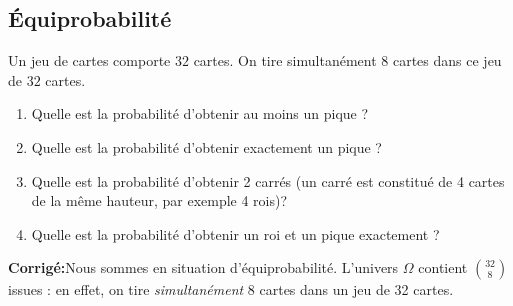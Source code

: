 \documentclass[a4paper,twoside,french,10pt]{VcCours}
\newcommand{\corr}{\textbf{Corrigé:}}
\begin{document}
\subsection{Équiprobabilité}





\begin{Exercice}{} Un jeu de cartes comporte $32$ cartes. On tire simultanément $8$ cartes dans ce jeu de $32$ cartes. 

\begin{enumerate}
\item Quelle est la probabilité d'obtenir au moins un pique ?
\item Quelle est la probabilité d'obtenir exactement un pique ?
\item Quelle est la probabilité d'obtenir 2 carrés (un carré est constitué de 4 cartes de la même hauteur, par exemple 4 rois)?
\item Quelle est la probabilité d'obtenir un roi et un pique exactement ?
\end{enumerate}
\end{Exercice} 

\corr Nous sommes en situation d'équiprobabilité. L'univers $\Omega$ contient $\binom{32}{8}$ issues : en effet, on tire \textit{simultanément} 8 cartes dans un jeu de 32 cartes.
\end{document}
